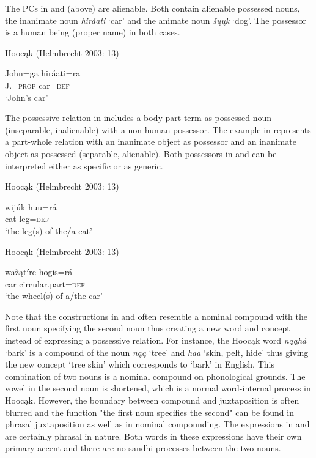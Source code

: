 \documentclass[output=paper]{LSP/langsci}
\begin{document}
The PCs in  and  (above) are alienable. Both contain alienable possessed nouns, the inanimate noun \textit{hiráati} `car' and the animate noun \textit{šųųk} `dog'. The possessor is a human being (proper name) in both cases. 

\ea Hoocąk (Helmbrecht 2003: 13) \label{johnscar}

\gll John=ga      hiráati=ra \\
J.=\textsc{prop} car=\textsc{def} \\
\glt `John's car'
\z

The possessive relation in  includes a body part term as possessed noun (inseparable, inalienable) with a non-human possessor. The example in  represents a part-whole relation with an inanimate object as possessor and an inanimate object as possessed (separable, alienable). Both possessors in  and  can be interpreted either as specific or as generic. 

\ea Hoocąk (Helmbrecht 2003: 13) \label{leg}

\gll wijúk huu=rá \\
cat      leg=\textsc{def} \\
\glt `the leg(s) of the/a cat'
\z

\ea Hooc\k{a}k (Helmbrecht 2003: 13) \label{wheel}

\gll waž\k{a}tíre hogis=rá \\
car  circular.part=\textsc{def} \\
\glt `the wheel(s) of a/the car'
\z

Note that the constructions in  and  often resemble a nominal compound with the first noun specifying the second noun thus creating a new word and concept instead of expressing a possessive relation. For instance, the Hoocąk word \textit{n\k{a}\k{a}h\'a} `bark' is a compound of the noun \textit{n\k{a}\k{a}} `tree' and \textit{haa} `skin, pelt, hide' thus giving the new concept `tree skin' which corresponds to `bark' in English. This combination of two nouns is a nominal compound on phonological grounds. The vowel in the second noun is shortened, which is a normal word-internal process in Hoocąk. However, the boundary between compound and juxtaposition is often blurred and the function "the first noun specifies the second" can be found in phrasal juxtaposition as well as in nominal compounding. The expressions in  and  are certainly phrasal in nature. Both words in these expressions have their own primary accent and there are no sandhi processes between the two nouns. 
\end{document}
